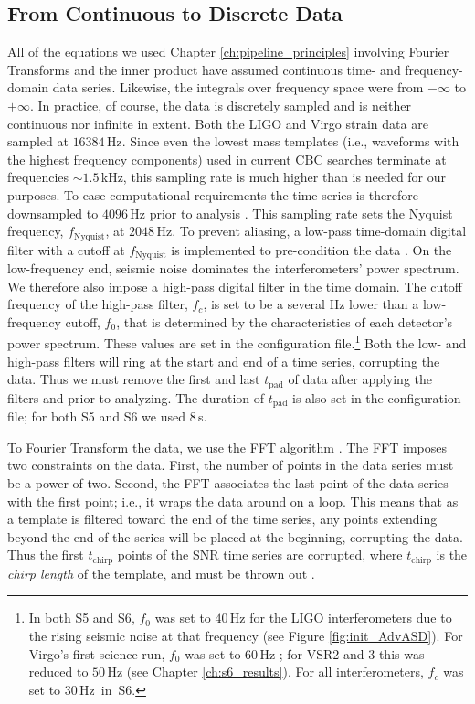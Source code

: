 \subsection{From Continuous to Discrete Data}
\label{sec:cont_to_discrete}

All of the equations we used Chapter \ref{ch:pipeline_principles} involving
Fourier Transforms and the inner product have assumed continuous time- and
frequency-domain data series.  Likewise, the integrals over frequency space
were from $-\infty$ to $+\infty$. In practice, of course, the data is
discretely sampled and is neither continuous nor infinite in extent. Both the
\ac{LIGO} and Virgo strain data are sampled at $16384\,\mathrm{Hz}$. Since even
the lowest mass templates (i.e., waveforms with the highest frequency
components) used in current \ac{CBC} searches terminate at frequencies
$\sim1.5\,$kHz, this sampling rate is much higher than is needed for our
purposes. To ease computational requirements the time series is therefore
downsampled to $4096\,\mathrm{Hz}$ prior to analysis \cite{brown-2005-22}. This
sampling rate sets the Nyquist frequency, $f_{\mathrm{Nyquist}}$, at
$2048\,\mathrm{Hz}$. To prevent aliasing, a low-pass time-domain digital filter
with a cutoff at $f_{\mathrm{Nyquist}}$ is implemented to pre-condition the
data \cite{brown-2005-22}. On the low-frequency end, seismic noise dominates
the interferometers' power spectrum.  We therefore also impose a high-pass
digital filter in the time domain. The cutoff frequency of the high-pass
filter, $f_c$, is set to be a several Hz lower than a low-frequency cutoff,
$f_0$, that is determined by the characteristics of each detector's power
spectrum. These values are set in the configuration file.\footnote{In both
\ac{S5} and \ac{S6}, $f_0$ was set to $40\,$Hz for the \ac{LIGO}
interferometers due to the rising seismic noise at that frequency (see Figure
\ref{fig:init_AdvASD}). For Virgo's first science run, $f_0$ was set to
$60\,$Hz \cite{S5LowMassLV}; for \ac{VSR2} and 3 this was reduced to $50\,$Hz
(see Chapter \ref{ch:s6_results}). For all interferometers, $f_c$ was set to
$30\,$Hz~in~\ac{S6}.} Both the low- and high-pass filters will ring at the
start and end of a time series, corrupting the data. Thus we must remove the
first and last $t_{\mathrm{pad}}$ of data after applying the filters and prior
to analyzing. The duration of $t_{\mathrm{pad}}$ is also set in the
configuration file; for both \ac{S5} and \ac{S6} we used $8\,$s.

To Fourier Transform the data, we use the \ac{FFT} algorithm
\cite{Allen:2005fk}. The \ac{FFT} imposes two constraints on the data. First,
the number of points in the data series must be a power of two. Second, the
\ac{FFT} associates the last point of the data series with the first point;
i.e., it wraps the data around on a loop. This means that as a template is
filtered toward the end of the time series, any points extending beyond the end
of the series will be placed at the beginning, corrupting the data. Thus the
first $t_{\mathrm{chirp}}$ points of the \ac{SNR} time series are corrupted,
where $t_{\mathrm{chirp}}$ is the \emph{chirp length} of the template, and must
be thrown out \cite{Brown}.

